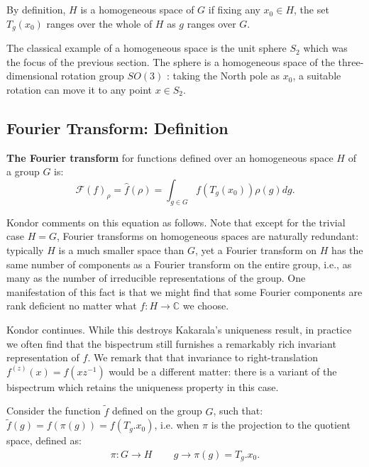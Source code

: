 \documentclass{article}
\begin{document}
\section{\color{purple}{Domain $\Omega = (H,~G,~\ast)$ (homogeneous space)}}

By definition, $H$ is a homogeneous space of $G$ if fixing any $x_0 \in H$, the set $T_g(x_0)$ ranges over the whole of $H$ as $g$ ranges over $G$.

The classical example of a homogeneous space is the unit sphere $S_2$ which was the focus of the previous section. The sphere is a homogeneous space of the three-dimensional rotation group $S O(3)$ : taking the North pole as $x_0$, a suitable rotation can move it to any point $x \in S_2$.



\subsection{Fourier Transform: Definition}

\textbf{The Fourier transform} for functions defined over an homogeneous space $H$ of a group $G$ is:
\begin{equation}
\mathcal{F}(f)_\rho = \widehat{f}(\rho) = \int_{g \in G} f\left(T_g(x_0)\right) \rho(g)dg.
\end{equation}

Kondor comments on this equation as follows. Note that except for the trivial case $H=G$, Fourier transforms on homogeneous spaces are naturally redundant: typically $H$ is a much smaller space than $G$, yet a Fourier transform on $H$ has the same number of components as a Fourier transform on the entire group, i.e., as many as the number of irreducible representations of the group. One manifestation of this fact is that we might find that some Fourier components are rank deficient no matter what $f: H \rightarrow \mathbb{C}$ we choose.

Kondor continues. While this destroys Kakarala's uniqueness result, in practice we often find that the bispectrum still furnishes a remarkably rich invariant representation of $f$. We remark that that invariance to right-translation $f^{(z)}(x)=f\left(x z^{-1}\right)$ would be a different matter: there is a variant of the bispectrum which retains the uniqueness property in this case.

Consider the function $\tilde{f}$ defined on the group $G$, such that: $\tilde{f}(g) = f(\pi(g)) = f(T_g.x_0)$, i.e. when $\pi$ is the projection to the quotient space, defined as:
\begin{align*}
    \pi : G \rightarrow H \, \qquad g \rightarrow \pi(g) = T_g.x_0.
\end{align*}
\end{document}
